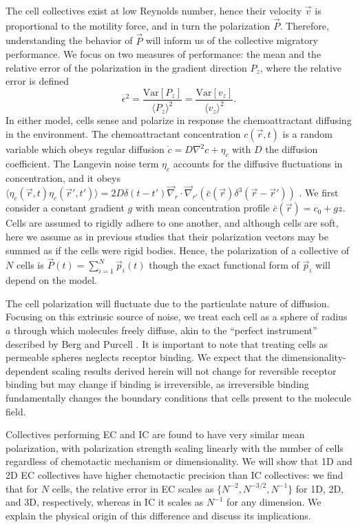 The cell collectives exist at low Reynolds number, hence their velocity $\vec{v}$ is proportional to the motility force, and in turn the polarization $\vec{P}$.
Therefore, understanding the behavior of $\vec{P}$ will inform us of the collective migratory performance. We focus on two measures of performance: the mean and the relative error of the polarization in the gradient direction $P_z$, where the relative error is defined
\begin{equation} \label{eq:error1}
    \epsilon^2
    = \frac{\text{Var}[P_z]}{\langle P_z \rangle^2}
    = \frac{\text{Var}[v_z]}{\langle v_z \rangle^2}.
\end{equation}
In either model, cells sense and polarize in response the chemoattractant diffusing in the environment.
The chemoattractant concentration $c(\vec{r},t)$ is a random variable
which obeys regular diffusion $\dot{c} = D\nabla^2c+\eta_c$ with $D$ the diffusion coefficient.
The Langevin noise term $\eta_c$ accounts for the diffusive fluctuations in concentration, and it obeys
$\langle \eta_c(\vec{r},t) \eta_c(\vec{r}',t') \rangle = 2 D \delta(t-t') \vec{\nabla}_{r} \cdot \vec{\nabla}_{r'} ( \bar{c}(\vec{r}) \delta^3(\vec{r}-\vec{r}'))$
\cite{gardiner1985handbook,fancher2016fundamental}.
We first consider a constant gradient $g$ with mean concentration profile
$\bar{c}(\vec{r}) = c_0 + gz$.
Cells are assumed to rigidly adhere to one another, and
although cells are soft, here we assume as in previous studies \cite{szabo2006phase,camley2016emergent,camley2016collective} that their polarization vectors may be summed as if the cells were rigid bodies.
Hence, the polarization of a collective of $N$ cells is $\vec{P}(t) = \sum_{i=1}^N \vec{p}_i(t)$ though the exact functional form of $\vec{p}_i$ will depend on the model.

The cell polarization will fluctuate due to the particulate nature of diffusion. Focusing on this extrinsic source of noise, we treat each cell as a sphere of radius $a$ through which molecules freely diffuse, akin to the ``perfect instrument'' described by Berg and Purcell \cite{berg1977physics}. It is important to note that treating cells as permeable spheres neglects receptor binding. We expect that the dimensionality-dependent scaling results derived herein will not change for reversible receptor binding but may change if binding is irreversible, as irreversible binding fundamentally changes the boundary conditions that cells present to the molecule field.

Collectives performing EC and IC are found to have very similar mean polarization, with polarization strength scaling linearly with the number of cells regardless of chemotactic mechanism or dimensionality. We will show that 1D and 2D EC collectives have higher chemotactic precision than IC collectives: we find that for $N$ cells, the relative error in EC scales as
$\{N^{-2}, N^{-3/2}, N^{-1}\}$ for 1D, 2D, and 3D, respectively, whereas in IC it scales as $N^{-1}$ for any dimension. We explain the physical origin of this difference and discuss its implications.

